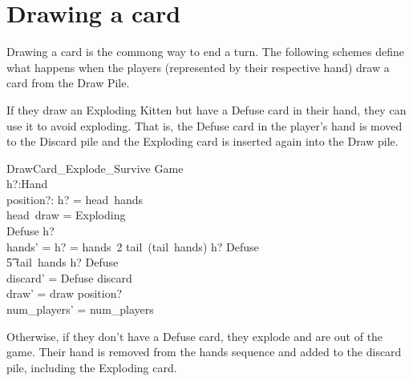 \documentclass[11pt, fuzz]{article}
\begin{document}



\section{Drawing a card}

Drawing a card is the commong way to end a turn. The following schemes define what happens when the players (represented by their respective hand) draw a card from the Draw Pile. 

If they draw an Exploding Kitten but have a Defuse card in their hand, they can use it to avoid exploding. That is, the Defuse card in the player's hand is moved to the Discard pile and the Exploding card is inserted again into the Draw pile.

\begin{schema}{DrawCard\_Explode\_Survive}
    \Delta Game \\
    h?:Hand \\
    position?: \nat
\where
    h? = head~hands \\
    head~draw = Exploding \\
    Defuse \inbag h? \\
    hands' = \IF h? = hands~2 \THEN tail~(tail~hands) \cat \langle h? \uminus \lbag Defuse \rbag \rangle \\ \t5 \ELSE tail~hands \cat \langle h? \uminus \lbag Defuse \rbag \rangle\\
    discard' = \langle Defuse \rangle \cat discard \\
    draw' = draw \insertHead position? \\
    num\_players' = num\_players
\end{schema}


Otherwise, if they don't have a Defuse card, they explode and are out of the game. Their hand is removed from the hands sequence and added to the discard pile, including the Exploding card. 
\end{document}
